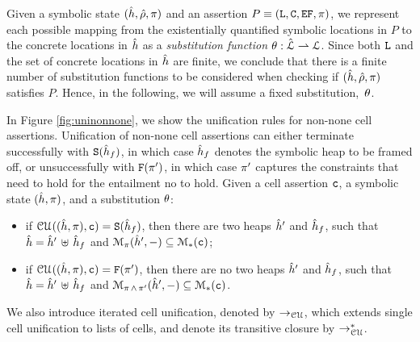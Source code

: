 \vspace{-10pt}
Given a symbolic state $(\sheap, \sstore, \pc)$ and an assertion $P \equiv (\existentials, \cells, \efs, \pfs)$, 
we represent each possible mapping from the existentially quantified symbolic locations in $P$ 
to the concrete locations in $\sheap$ as a \emph{substitution function} $\subst : \slocs \rightharpoonup \locs$.
Since both $\existentials$ and the set of concrete locations in $\sheap$ 
are finite, we conclude that there is a finite number of substitution functions to be considered 
when checking if $(\sheap, \sstore, \pc)$ satisfies $P$. 
%
Hence, in the following, we will assume a fixed substitution,~$\subst$. 

In Figure \ref{fig:uninonnone}, we show the unification rules for non-none cell assertions. 
Unification of non-none cell assertions can either terminate
successfully with $\uyes{\sheap_f}$, in which case $\sheap_f$ denotes the
symbolic heap to be framed off, or unsuccessfully with $\uno{\pc'}$, 
in which case $\pc'$ captures the constraints that need to hold for 
the entailment no to hold.
Given a cell assertion $\cell$, a symbolic state $(\sheap, \pc)$, 
and a substitution $\subst$: 
\begin{itemize}
    \item if $\unification{\sheap, \pc}{\cell}{} = \uyes{\sheap_f}$, then there are 
            two heaps $\sheap'$ and $\sheap_f$, such that $\sheap = \sheap' \dunion \sheap_f$
            and $\smodels{\sheap', -}{\pc} \subseteq \sepmodels{\cell}$; 
   
   \item if $\unification{\sheap, \pc}{\cell}{} = \uno{\pc'}$, then there are 
            no two heaps $\sheap'$ and $\sheap_f$, such that $\sheap = \sheap' \dunion \sheap_f$ 
            and $\smodels{\sheap', -}{\pc \, \wedge \, \pc'} \subseteq \sepmodels{\cell}$.
\end{itemize}
We also introduce iterated cell unification, denoted by $\rightarrow_{\cal CU}$, which extends single cell unification to lists of cells, and denote its transitive closure by $\rightarrow_{\cal CU}^*$. 

